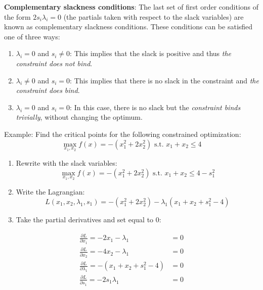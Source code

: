 \documentclass[
]{book}
\providecommand{\tightlist}{%
  \setlength{\itemsep}{0pt}\setlength{\parskip}{0pt}}
\theoremstyle{definition}
\theoremstyle{definition}
\theoremstyle{definition}
\theoremstyle{remark}
\begin{document}
\textbf{Complementary slackness conditions}: The last set of first order conditions of the form \(2s_i\lambda_i = 0\) (the partials taken with respect to the slack variables) are known as complementary slackness conditions. These conditions can be satisfied one of three ways:

\begin{enumerate}
\def\labelenumi{\arabic{enumi}.}
\tightlist
\item
  \(\lambda_i = 0\) and \(s_i \neq 0\): This implies that the slack is positive and thus \emph{the constraint does not bind}.
\item
  \(\lambda_i \neq 0\) and \(s_i = 0\): This implies that there is no slack in the constraint and \emph{the constraint does bind}.
\item
  \(\lambda_i = 0\) and \(s_i = 0\): In this case, there is no slack but the \emph{constraint binds trivially}, without changing the optimum.
\end{enumerate}

Example: Find the critical points for the following constrained optimization:
\[\max_{x_1,x_2} f(x) = -(x_1^2 + 2x_2^2) \text{ s.t. } x_1 + x_2 \le 4\]

\begin{enumerate}
\def\labelenumi{\arabic{enumi}.}
\item
  Rewrite with the slack variables:
  \[\max_{x_1,x_2} f(x) = -(x_1^2 + 2x_2^2) \text{ s.t. } x_1 + x_2 \le 4 - s_1^2\]
\item
  Write the Lagrangian:
  \[L(x_1,x_2,\lambda_1,s_1) = -(x_1^2 + 2x_2^2) - \lambda_1 (x_1 + x_2 + s_1^2 - 4)\]
\item
  Take the partial derivatives and set equal to 0:
\end{enumerate}

\begin{align*}
\frac{\partial L}{\partial x_1} = -2x_1 - \lambda_1  &= 0\\
\frac{\partial L}{\partial x_2}  = -4x_2 - \lambda_1 &=  0\\
\frac{\partial L}{\partial \lambda_1} = -(x_1 + x_2 + s_1^2 - 4)&= 0\\
\frac{\partial L}{\partial s_1} = -2s_1\lambda_1 &= 0\\
\end{align*}
\end{document}

